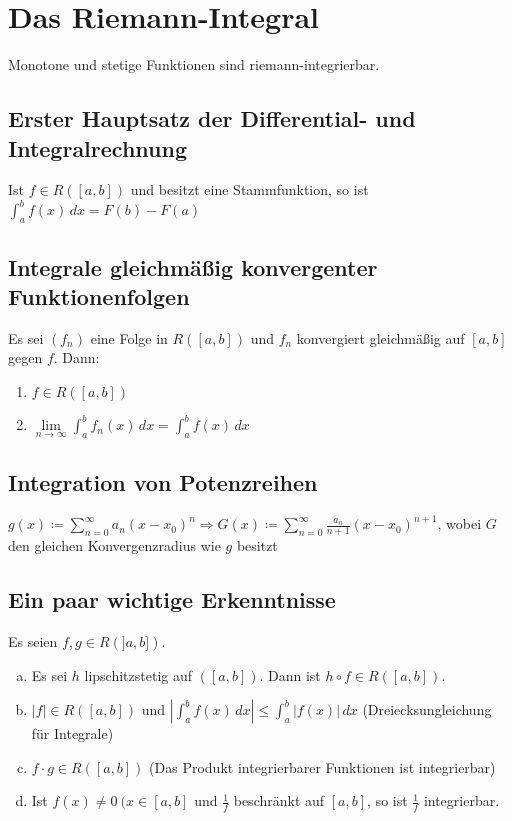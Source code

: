 \section{Das Riemann-Integral}
Monotone und stetige Funktionen sind riemann-integrierbar.

\subsection{Erster Hauptsatz der Differential- und Integralrechnung}
Ist $f \in R([a,b])$ und besitzt eine Stammfunktion, so ist $\int_a^b f(x)\,dx = F(b) - F(a)$

\subsection{Integrale gleichmäßig konvergenter Funktionenfolgen}
Es sei $(f_n)$ eine Folge in $R([a,b])$ und $f_n$ konvergiert gleichmäßig auf $[a,b]$ gegen $f$. Dann:
\begin{enumerate}
    \item $f \in R([a,b])$
    \item $\lim \limits_{n \to \infty} \int_a^b f_n(x)\,dx = \int_a^b f(x)\,dx$
\end{enumerate}

\subsection{Integration von Potenzreihen}
$g(x) \coloneqq \sum \limits_{n=0}^{\infty} a_n (x-x_0)^n \Rightarrow G(x) \coloneqq \sum \limits_{n=0}^{\infty} \frac{a_n}{n+1} (x-x_0)^{n+1}$, 
wobei $G$ den gleichen Konvergenzradius wie $g$ besitzt

\subsection{Ein paar wichtige Erkenntnisse}
Es seien $f,g \in R(]a,b])$.
\begin{enumerate} [a)]
    \item Es sei $h$ lipschitzstetig auf $([a,b])$. Dann ist $h \circ f \in R([a,b])$.
    \item $|f| \in R([a,b])$ und $|\int_a^b f(x)\,dx| \leq \int_a^b|f(x)|\,dx$ (Dreiecksungleichung für Integrale)
    \item $f \cdot g \in R([a,b])$ (Das Produkt integrierbarer Funktionen ist integrierbar)
    \item Ist $f(x) \neq 0\ (x \in [a,b]$ und $\frac{1}{f}$ beschränkt auf $[a,b]$, so ist $\frac{1}{f}$ integrierbar.
\end{enumerate}

